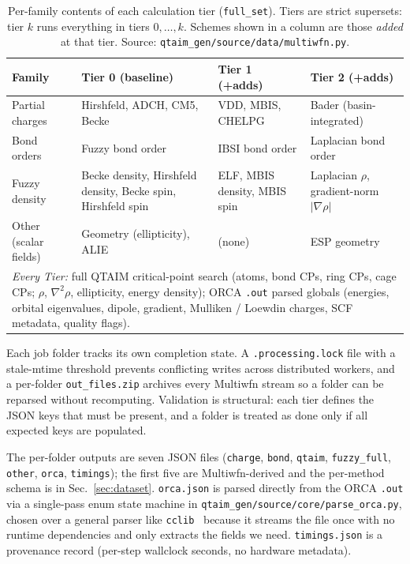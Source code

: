 \begin{table}[H]
\centering
\small
\caption{Per-family contents of each calculation tier (\texttt{full\_set}). Tiers are
strict supersets: tier $k$ runs everything in tiers $0, \dots, k$. Schemes shown in a column
are those \emph{added} at that tier. Source: \texttt{qtaim\_gen/source/data/multiwfn.py}.}
\label{tab:tiers}
\begin{tabular}{lp{3.6cm}p{3.0cm}p{3.4cm}}
\toprule
\textbf{Family} & \textbf{Tier 0 (baseline)} & \textbf{Tier 1 (+adds)} & \textbf{Tier 2 (+adds)} \\
\midrule
Partial charges & Hirshfeld, ADCH, CM5, Becke & VDD, MBIS, CHELPG & Bader (basin-integrated) \\
Bond orders & Fuzzy bond order & IBSI bond order & Laplacian bond order \\
Fuzzy density & Becke density, Hirshfeld density, Becke spin, Hirshfeld spin & ELF, MBIS density, MBIS spin & Laplacian $\rho$, gradient-norm $|\nabla \rho|$ \\
Other (scalar fields) & Geometry (ellipticity), ALIE & (none) & ESP geometry \\
\midrule
\multicolumn{4}{p{12cm}}{\textit{Every Tier:} full QTAIM critical-point search (atoms, bond CPs, ring CPs, cage CPs; $\rho$, $\nabla^2\rho$, ellipticity, energy density); ORCA \texttt{.out} parsed globals (energies, orbital eigenvalues, dipole, gradient, Mulliken / Loewdin charges, SCF metadata, quality flags).} \\
\bottomrule
\end{tabular}
\end{table}

Each job folder tracks its own completion state. A \texttt{.processing.lock} file with a
stale-mtime threshold prevents conflicting writes across distributed workers, and a
per-folder \texttt{out\_files.zip} archives every Multiwfn stream so a folder can be
reparsed without recomputing. Validation is structural: each tier defines the JSON keys
that must be present, and a folder is treated as done only if all expected keys are populated.

The per-folder outputs are seven JSON files (\texttt{charge}, \texttt{bond}, \texttt{qtaim},
\texttt{fuzzy\_full}, \texttt{other}, \texttt{orca}, \texttt{timings}); the first five are
Multiwfn-derived and the per-method schema is in Sec.~\ref{sec:dataset}. \texttt{orca.json}
is parsed directly from the ORCA \texttt{.out} via a single-pass enum state machine in
\texttt{qtaim\_gen/source/core/parse\_orca.py}, chosen over a general parser like
\texttt{cclib}~\citep{cclib} because it streams the file once with no runtime dependencies
and only extracts the fields we need. \texttt{timings.json} is a provenance record (per-step
wallclock seconds, no hardware metadata).


